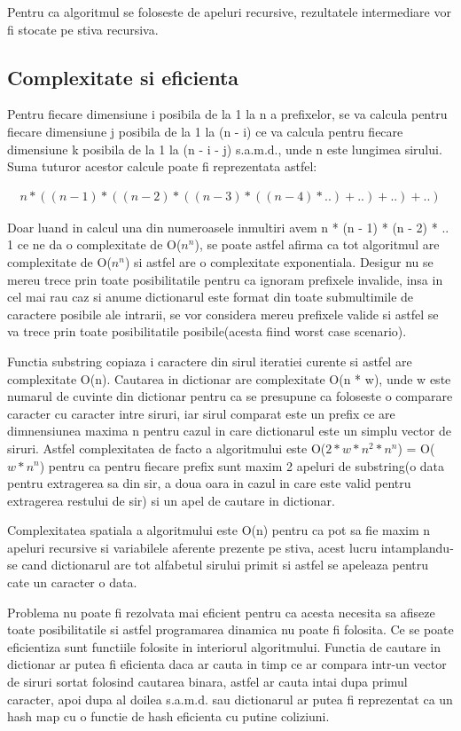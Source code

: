 \documentclass[runningheads]{llncs}
\begin{document}
Pentru ca algoritmul se foloseste de apeluri recursive, rezultatele intermediare vor fi stocate pe stiva recursiva.
\newpage
\subsection{Complexitate si eficienta}
Pentru fiecare dimensiune i posibila de la 1 la n a prefixelor, se va calcula pentru fiecare dimensiune j posibila de la 1 la (n - i)
ce va calcula pentru fiecare dimensiune k posibila de la 1 la (n - i - j) s.a.m.d., unde n este lungimea sirului. Suma tuturor acestor
calcule poate fi reprezentata astfel:

\begin{align*}
n * ((n - 1) * ((n - 2) * ((n - 3) * ((n - 4) * ..) + ..) + ..) + ..)
\end{align*}

Doar luand in calcul una din numeroasele inmultiri avem n * (n - 1) * (n - 2) * .. 1 ce ne da o complexitate de O($n^n$), se poate
astfel afirma ca tot algoritmul are complexitate de O($n^n$) si astfel are o complexitate exponentiala. Desigur nu se mereu trece prin
toate posibilitatile pentru ca ignoram prefixele invalide, insa in cel mai rau caz si anume dictionarul este format din toate submultimile
de caractere posibile ale intrarii, se vor considera mereu prefixele valide si astfel se va trece prin toate posibilitatile posibile(acesta
fiind worst case scenario).

Functia substring copiaza i caractere din sirul iteratiei curente si astfel are complexitate O(n). Cautarea in dictionar are
complexitate O(n * w), unde w este numarul de cuvinte din dictionar pentru ca se presupune ca foloseste o comparare caracter cu
caracter intre siruri, iar sirul comparat este un prefix ce are dimnensiunea maxima n pentru cazul in care dictionarul este un simplu
vector de siruri. Astfel complexitatea de facto a algoritmului este O($2 * w * n^2 * n^n$) = O($w * n^n$) pentru ca pentru fiecare prefix
sunt maxim 2 apeluri de substring(o data pentru extragerea sa din sir, a doua oara in cazul in care este valid pentru extragerea restului de sir)
si un apel de cautare in dictionar.

Complexitatea spatiala a algoritmului este O(n) pentru ca pot sa fie maxim n apeluri recursive si variabilele aferente prezente pe stiva,
acest lucru intamplandu-se cand dictionarul are tot alfabetul sirului primit si astfel se apeleaza pentru cate un caracter o data.

Problema nu poate fi rezolvata mai eficient pentru ca acesta necesita sa afiseze toate posibilitatile si astfel programarea
dinamica nu poate fi folosita. Ce se poate eficientiza sunt functiile folosite in interiorul algoritmului. Functia de cautare in dictionar
ar putea fi eficienta daca ar cauta in timp ce ar compara intr-un vector de siruri sortat folosind cautarea binara, astfel ar cauta
intai dupa primul caracter, apoi dupa al doilea s.a.m.d. sau dictionarul ar putea fi reprezentat ca un hash map cu o functie de hash
eficienta cu putine coliziuni.
\end{document}
